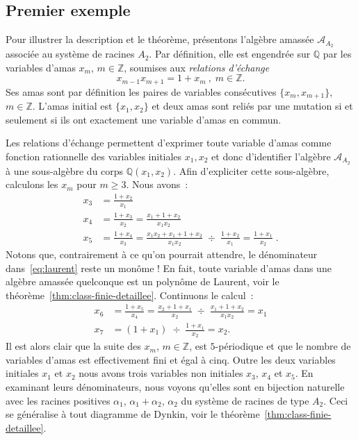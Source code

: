 \documentclass[brochure,12pt]{bourbaki}
\newcommand{\ko}{\: , \;}
\numberwithin{equation}{subsection}
\numberwithin{theorem}{section}
\newcommand{\Z}{\mathbb{Z}}
\newcommand{\Q}{\mathbb{Q}}
\newcommand{\ca}{{\mathcal A}}
\begin{document}
\subsection{Premier exemple}
Pour illustrer la description et le th\'eor\`eme, pr\'esentons \cite{Zelevinsky07a}
l'alg\`ebre amass\'ee $\ca_{A_2}$ associ\'ee au syst\`eme de racines $A_2$.
Par d\'efinition, elle est engendr\'ee sur $\Q$ par les variables
d'amas $x_m$, $m\in \Z$, soumises aux {\em relations d'\'echange}
\[
x_{m-1} x_{m+1} = 1+x_m \ko m\in \Z.
\]
Ses amas sont par d\'efinition les paires de variables cons\'ecutives
$\{ x_m, x_{m+1}\}$, $m\in \Z$. L'amas initial est $\{x_1, x_2\}$ et
deux amas sont reli\'es par une mutation si et seulement si ils ont
exactement une variable d'amas en commun.

Les relations d'\'echange permettent d'exprimer toute variable d'amas
comme fonction rationnelle des variables initiales $x_1, x_2$ et donc
d'identifier l'alg\`ebre $\ca_{A_2}$ \`a une sous-alg\`ebre du corps
$\Q(x_1, x_2)$. Afin d'expliciter cette sous-alg\`ebre, calculons les
$x_m$ pour $m\geq 3$.  Nous avons~:
\begin{align}
x_3 &= \frac{1+x_2}{x_1} \\
x_4 &= \frac{1+x_3}{x_2} = \frac{x_1 + 1 + x_2}{x_1 x_2}\\
x_5 &= \frac{1+x_4}{x_3}
= \frac{x_1 x_2 + x_1 +1 +x_2}{x_1 x_2}\; \div \; \frac{1+x_2}{x_1}
= \frac{1+x_1}{x_2} \; . \label{eq:laurent}
\end{align}
Notons que, contrairement \`a ce qu'on pourrait attendre,
le d\'enominateur dans~\ref{eq:laurent} reste un mon\^ome !
En fait, toute variable d'amas dans une alg\`ebre amass\'ee quelconque
est un polyn\^ome de Laurent, voir le th\'eor\`eme~\ref{thm:class-finie-detaillee}.
 Continuons le calcul~:
\begin{align}
x_6 &= \frac{1+x_5}{x_4}
     =  \frac{x_2+1+x_1}{x_2}\; \div \;\frac{x_1+1+x_2}{x_1 x_2} = x_1 \\
x_7 &= (1+x_1)\; \div \; \frac{1+x_1}{x_2}  = x_2.
\end{align}
Il est alors clair que la suite des $x_m$, $m\in\Z$, est $5$-p\'eriodique
et que le nombre de variables d'amas est effectivement fini
et \'egal \`a cinq. Outre les deux variables initiales
$x_1$ et $x_2$ nous avons trois variables non initiales
$x_3$, $x_4$ et $x_5$. En examinant leurs d\'enominateurs,
nous voyons qu'elles sont en bijection naturelle
avec les racines positives $\alpha_1$, $\alpha_1+\alpha_2$, $\alpha_2$
du syst\`eme de racines de type $A_2$. Ceci se g\'en\'eralise
\`a tout diagramme de Dynkin, voir le th\'eor\`eme~\ref{thm:class-finie-detaillee}.
\end{document}
